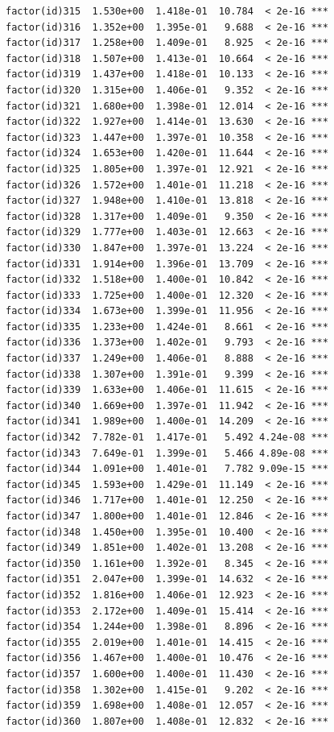 \documentclass[]{book}
\begin{document}
\begin{verbatim}
factor(id)315  1.530e+00  1.418e-01  10.784  < 2e-16 ***
factor(id)316  1.352e+00  1.395e-01   9.688  < 2e-16 ***
factor(id)317  1.258e+00  1.409e-01   8.925  < 2e-16 ***
factor(id)318  1.507e+00  1.413e-01  10.664  < 2e-16 ***
factor(id)319  1.437e+00  1.418e-01  10.133  < 2e-16 ***
factor(id)320  1.315e+00  1.406e-01   9.352  < 2e-16 ***
factor(id)321  1.680e+00  1.398e-01  12.014  < 2e-16 ***
factor(id)322  1.927e+00  1.414e-01  13.630  < 2e-16 ***
factor(id)323  1.447e+00  1.397e-01  10.358  < 2e-16 ***
factor(id)324  1.653e+00  1.420e-01  11.644  < 2e-16 ***
factor(id)325  1.805e+00  1.397e-01  12.921  < 2e-16 ***
factor(id)326  1.572e+00  1.401e-01  11.218  < 2e-16 ***
factor(id)327  1.948e+00  1.410e-01  13.818  < 2e-16 ***
factor(id)328  1.317e+00  1.409e-01   9.350  < 2e-16 ***
factor(id)329  1.777e+00  1.403e-01  12.663  < 2e-16 ***
factor(id)330  1.847e+00  1.397e-01  13.224  < 2e-16 ***
factor(id)331  1.914e+00  1.396e-01  13.709  < 2e-16 ***
factor(id)332  1.518e+00  1.400e-01  10.842  < 2e-16 ***
factor(id)333  1.725e+00  1.400e-01  12.320  < 2e-16 ***
factor(id)334  1.673e+00  1.399e-01  11.956  < 2e-16 ***
factor(id)335  1.233e+00  1.424e-01   8.661  < 2e-16 ***
factor(id)336  1.373e+00  1.402e-01   9.793  < 2e-16 ***
factor(id)337  1.249e+00  1.406e-01   8.888  < 2e-16 ***
factor(id)338  1.307e+00  1.391e-01   9.399  < 2e-16 ***
factor(id)339  1.633e+00  1.406e-01  11.615  < 2e-16 ***
factor(id)340  1.669e+00  1.397e-01  11.942  < 2e-16 ***
factor(id)341  1.989e+00  1.400e-01  14.209  < 2e-16 ***
factor(id)342  7.782e-01  1.417e-01   5.492 4.24e-08 ***
factor(id)343  7.649e-01  1.399e-01   5.466 4.89e-08 ***
factor(id)344  1.091e+00  1.401e-01   7.782 9.09e-15 ***
factor(id)345  1.593e+00  1.429e-01  11.149  < 2e-16 ***
factor(id)346  1.717e+00  1.401e-01  12.250  < 2e-16 ***
factor(id)347  1.800e+00  1.401e-01  12.846  < 2e-16 ***
factor(id)348  1.450e+00  1.395e-01  10.400  < 2e-16 ***
factor(id)349  1.851e+00  1.402e-01  13.208  < 2e-16 ***
factor(id)350  1.161e+00  1.392e-01   8.345  < 2e-16 ***
factor(id)351  2.047e+00  1.399e-01  14.632  < 2e-16 ***
factor(id)352  1.816e+00  1.406e-01  12.923  < 2e-16 ***
factor(id)353  2.172e+00  1.409e-01  15.414  < 2e-16 ***
factor(id)354  1.244e+00  1.398e-01   8.896  < 2e-16 ***
factor(id)355  2.019e+00  1.401e-01  14.415  < 2e-16 ***
factor(id)356  1.467e+00  1.400e-01  10.476  < 2e-16 ***
factor(id)357  1.600e+00  1.400e-01  11.430  < 2e-16 ***
factor(id)358  1.302e+00  1.415e-01   9.202  < 2e-16 ***
factor(id)359  1.698e+00  1.408e-01  12.057  < 2e-16 ***
factor(id)360  1.807e+00  1.408e-01  12.832  < 2e-16 ***

\end{verbatim}
\end{document}
